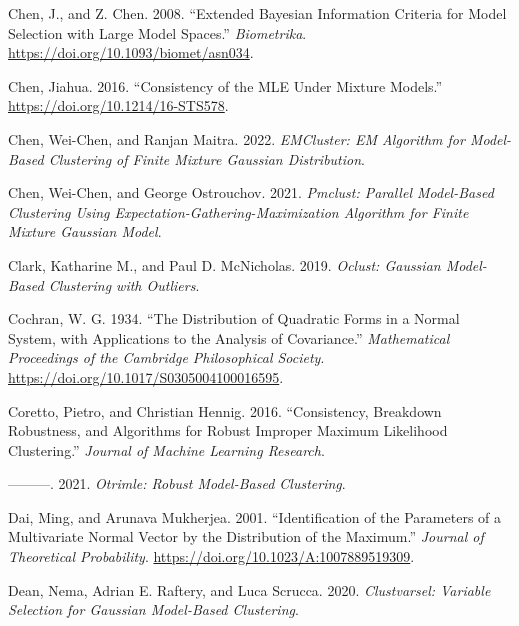 \begin{CSLReferences}{1}{0}
\leavevmode{}%
Chen, J., and Z. Chen. 2008. {``Extended {Bayesian} Information Criteria for Model Selection with Large Model Spaces.''} \emph{Biometrika}. \url{https://doi.org/10.1093/biomet/asn034}.

\leavevmode{}%
Chen, Jiahua. 2016. {``Consistency of the {MLE} Under Mixture Models.''} \url{https://doi.org/10.1214/16-STS578}.

\leavevmode{}%
Chen, Wei-Chen, and Ranjan Maitra. 2022. \emph{EMCluster: EM Algorithm for Model-Based Clustering of Finite Mixture Gaussian Distribution}.

\leavevmode{}%
Chen, Wei-Chen, and George Ostrouchov. 2021. \emph{Pmclust: Parallel Model-Based Clustering Using Expectation-Gathering-Maximization Algorithm for Finite Mixture Gaussian Model}.

\leavevmode{}%
Clark, Katharine M., and Paul D. McNicholas. 2019. \emph{Oclust: Gaussian Model-Based Clustering with Outliers}.

\leavevmode{}%
Cochran, W. G. 1934. {``The Distribution of Quadratic Forms in a Normal System, with Applications to the Analysis of Covariance.''} \emph{Mathematical Proceedings of the Cambridge Philosophical Society}. \url{https://doi.org/10.1017/S0305004100016595}.

\leavevmode{}%
Coretto, Pietro, and Christian Hennig. 2016. {``Consistency, Breakdown Robustness, and Algorithms for Robust Improper Maximum Likelihood Clustering.''} \emph{Journal of Machine Learning Research}.

\leavevmode{}%
---------. 2021. \emph{Otrimle: Robust Model-Based Clustering}.

\leavevmode{}%
Dai, Ming, and Arunava Mukherjea. 2001. {``Identification of the {Parameters} of a {Multivariate Normal Vector} by the {Distribution} of the {Maximum}.''} \emph{Journal of Theoretical Probability}. \url{https://doi.org/10.1023/A:1007889519309}.

\leavevmode{}%
Dean, Nema, Adrian E. Raftery, and Luca Scrucca. 2020. \emph{Clustvarsel: Variable Selection for Gaussian Model-Based Clustering}.


\end{CSLReferences}
